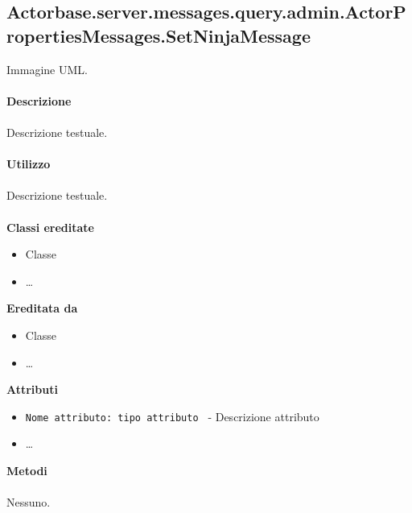 \documentclass[a4paper]{article}
\begin{document}
\subsection{Actorbase.server.messages.query.admin.ActorPropertiesMessages.SetNinjaMessage}
		Immagine UML.
		\\ \\
		\textbf{Descrizione}
			\\ \\
			Descrizione testuale.
			\\ \\
		\textbf{Utilizzo}
			\\ \\
			Descrizione testuale.
			\\ \\
		\textbf{Classi ereditate}
			\begin{itemize}
				\item Classe
				\item \dots
			\end{itemize}
		\textbf{Ereditata da}
			\begin{itemize}
				\item Classe
				\item \dots
			\end{itemize}
		\textbf{Attributi}
			\begin{itemize}
				\item \texttt{Nome attributo: tipo attributo } - Descrizione attributo
				\item \dots
			\end{itemize}
		\textbf{Metodi}
			\\ \\
			Nessuno.			
			
\end{document}
